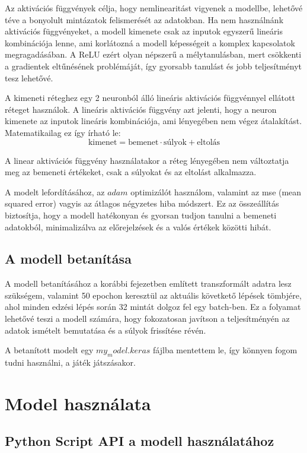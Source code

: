 Az aktivációs függvények célja, hogy nemlinearitást vigyenek a modellbe, lehetővé téve a bonyolult mintázatok felismerését az adatokban. 
Ha nem használnánk aktivációs függvényeket, a modell kimenete csak az inputok egyszerű lineáris kombinációja lenne, ami korlátozná a modell képességeit a komplex kapcsolatok megragadásában.
A ReLU ezért olyan népszerű a mélytanulásban, mert csökkenti a gradientek eltűnésének problémáját, így gyorsabb tanulást és jobb teljesítményt tesz lehetővé.

A kimeneti réteghez egy 2 neuronból álló lineáris aktivációs függvénnyel ellátott réteget használok. A lineáris aktivációs függvény azt jelenti, hogy a neuron kimenete az inputok lineáris kombinációja, ami lényegében nem végez átalakítást. Matematikailag ez így írható le:
\begin{equation}\label{eq:3}
\text{kimenet} = \text{bemenet} \cdot \text{súlyok} + \text{eltolás}
\end{equation}
    

A linear aktivációs függvény használatakor a réteg lényegében nem változtatja meg az bemeneti értékeket, csak a súlyokat és az eltolást alkalmazza.

A modelt lefordításához, az $adam$ optimizálót használom, valamint az mse (mean squared error) vagyis az átlagos négyzetes hiba módszert. 
Ez az összeállítás biztosítja, hogy a modell hatékonyan és gyorsan tudjon tanulni a bemeneti adatokból, minimalizálva az előrejelzések és a valós értékek közötti hibát.

\subsection{A modell betanítása}
A modell betanításához a korábbi fejezetben említett transzformált adatra lesz szükségem,
valamint 50 epochon keresztül az aktuális követkető lépések tömbjére, ahol minden edzési lépés során 32 mintát dolgoz fel egy batch-ben. 
Ez a folyamat lehetővé teszi a modell számára, hogy fokozatosan javítson a teljesítményén az adatok ismételt bemutatása és a súlyok frissítése révén. 

A betanított modelt egy $my_model.keras$ fájlba mentettem le, így könnyen fogom tudni használni, a játék játszásakor. 

\section{Model használata}

\subsection{Python Script API a modell használatához}

